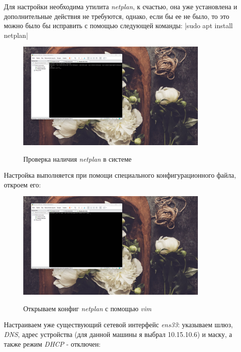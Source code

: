 \documentclass[a4paper]{article}
\begin{document}
  Для настройки необходима утилита \textit{netplan}, к счастью, она уже установлена
  и дополнительные действия не требуются, однако, если бы ее не было, то это можно 
  было бы исправить с помощью следующей команды:
  |sudo apt install netplan|

  \begin{figure}[H]
    \centering
    \includegraphics[width=0.85\textwidth]{06_00 (32)}
    \label{img:32}
    \caption{Проверка наличия \textit{netplan} в системе}
  \end{figure}
  
  Настройка выполняется при помощи специального конфигурационного файла, откроем его:

  \begin{figure}[H]
    \centering
    \includegraphics[width=0.85\textwidth]{06_00 (33)}
    \label{img:33}
    \caption{Открываем конфиг \textit{netplan} с помощью \textit{vim}}
  \end{figure}
  
  Настраиваем уже существующий сетевой интерфейс \textit{ens33}:
  указываем шлюз, \textit{DNS}, адрес устройства (для данной машины я выбрал
  10.15.10.6) и маску, а также режим \textit{DHCP} - отключен:
  
\end{document}
